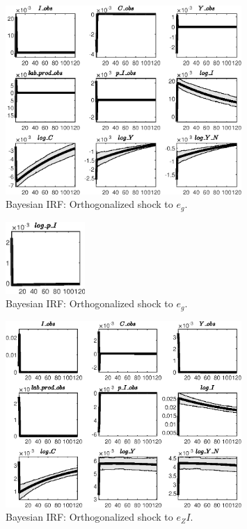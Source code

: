  
\begin{figure}[H]
\centering 
\includegraphics[width=0.80\textwidth]{BRS_growth_ext_fd_v1/Output/BRS_growth_ext_fd_v1_Bayesian_IRF_e_g_1}
\caption{Bayesian IRF: Orthogonalized shock to ${e_g}$.}
\label{Fig:BayesianIRF:e_g:1}
\end{figure}
 
\begin{figure}[H]
\centering 
\includegraphics[width=0.27\textwidth]{BRS_growth_ext_fd_v1/Output/BRS_growth_ext_fd_v1_Bayesian_IRF_e_g_2}
\caption{Bayesian IRF: Orthogonalized shock to ${e_g}$.}
\label{Fig:BayesianIRF:e_g:2}
\end{figure}
 
\begin{figure}[H]
\centering 
\includegraphics[width=0.80\textwidth]{BRS_growth_ext_fd_v1/Output/BRS_growth_ext_fd_v1_Bayesian_IRF_e_ZI_1}
\caption{Bayesian IRF: Orthogonalized shock to ${e_ZI}$.}
\label{Fig:BayesianIRF:e_ZI:1}
\end{figure}
 
